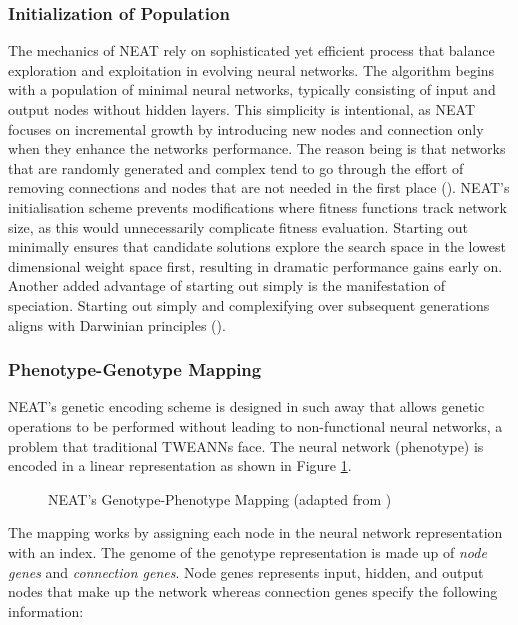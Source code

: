 \subsubsection{Initialization of Population}
The mechanics of NEAT rely on sophisticated yet efficient process that balance exploration and exploitation in evolving neural networks. The algorithm begins with a population of minimal neural networks, typically consisting of input and output nodes without hidden layers. This simplicity is intentional, as NEAT focuses on incremental growth by introducing new nodes and connection only when they enhance the networks performance. The reason being is that networks that are randomly generated and complex tend to go through the effort of removing connections and nodes that are not needed in the first place (\cite{stanley2002evolving}). NEAT's initialisation scheme prevents modifications where fitness functions track network size, as this would unnecessarily complicate fitness evaluation. Starting out minimally ensures that candidate solutions explore the search space in the lowest dimensional weight space first, resulting in dramatic performance gains early on. Another added advantage of starting out simply is the manifestation of speciation. Starting out simply and complexifying over subsequent generations aligns with Darwinian principles (\cite{stanley2002evolving}).

\subsubsection{Phenotype-Genotype Mapping}
NEAT's genetic encoding scheme is designed in such away that allows genetic operations to be performed without leading to non-functional neural networks, a problem that traditional TWEANNs face. The neural network (phenotype) is encoded in a linear representation as shown in Figure \ref{fig:genotype_phenotype_neat_mapping}.

\begin{figure}[H] %
	\centering %
	\caption{NEAT's Genotype-Phenotype Mapping (adapted from \cite{stanley2002evolving})}
	\label{fig:genotype_phenotype_neat_mapping} %
\end{figure}

\noindent The mapping works by assigning each node in the neural network representation with an index. The genome of the genotype representation is made up of \textit{node genes} and \textit{connection genes}. Node genes represents input, hidden, and output nodes that make up the network whereas connection genes specify the following information:

